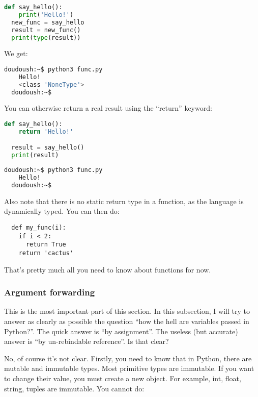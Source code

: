 \begin{lstlisting}[language=python]
  def say_hello():
    print('Hello!')
  new_func = say_hello
  result = new_func()
  print(type(result))
\end{lstlisting}

We get:
\begin{lstlisting}[language=bash]
  doudoush:~$ python3 func.py
    Hello!
    <class 'NoneType'>
  doudoush:~$
\end{lstlisting}

You can otherwise return a real result using the ``return'' keyword:

\begin{lstlisting}[language=python]
  def say_hello():
    return 'Hello!'

  result = say_hello()
  print(result)
\end{lstlisting}

\begin{lstlisting}[language=bash]
  doudoush:~$ python3 func.py
    Hello!
  doudoush:~$
\end{lstlisting}

Also note that there is no static return type in a function, as the language is dynamically typed. You can
then do:

\begin{lstlisting}
  def my_func(i):
    if i < 2:
      return True
    return 'cactus'
\end{lstlisting}

That's pretty much all you need to know about functions for now.

\subsubsection{Argument forwarding}

This is the most important part of this section. In this subsection, I will
try to answer as clearly as possible the question ``how the hell are variables
passed in Python?''. The quick answer is ``by assignment''. The useless (but accurate)
answer is ``by un-rebindable reference''. Is that clear?

\vspace{5mm}

No, of course it's not clear. Firstly, you need to know that in
Python, there are mutable and immutable types. Most primitive types
are immutable. If you want to change their value, you must create a
new object. For example, int, float, string, tuples are immutable. You
cannot do:

